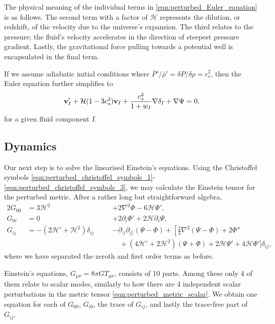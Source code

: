 The physical meaning of the individual terms in \eqref{eqn:perturbed_Euler_equation} is as follows. The second term with a factor of $\mathcal{H}$ represents the dilution, or redshift, of the velocity due to the universe's expansion. The third relates to the pressure; the fluid's velocity accelerates in the direction of steepest pressure gradient. Lastly, the gravitational force pulling towards a potential well is encapsulated in the final term.

If we assume adiabatic initial conditions where $\bar{P}'/\bar{\rho}' = \delta P / \delta \rho = c^2_s$, then the Euler equation further simplifies to
\begin{align}
	\mathbf{v}'_I + \mathcal{H} (1 - 3c^2_s) \mathbf{v}_I + \frac{c^2_s}{1+w_I} \nabla\delta_I + \nabla\Psi = 0,
\end{align}
for a given fluid component $I$.


\subsection{Dynamics}

Our next step is to solve the linearised Einstein's equations. Using the Christoffel symbols \eqref{eqn:perturbed_christoffel_symbols_1}-\eqref{eqn:perturbed_christoffel_symbols_3}, we may calculate the Einstein tensor for the perturbed metric. After a rather long but straightforward algebra,
\begin{alignat}{2}
	G_{00} &= 3\mathcal{H}^2 \quad&&+ 2\nabla^2 \Phi - 6 \mathcal{H} \Phi', \label{eqn:perturbed_einstein_tensor_1}\\
	G_{0i} &= 0 \quad&&+ 2\partial_i \Phi' + 2 \mathcal{H} \partial_i \Psi, \label{eqn:perturbed_einstein_tensor_2}\\
	G_{ij} &= -(2\mathcal{H}' + \mathcal{H}^2) \delta_{ij} \quad&&- \partial_{\langle i} \partial_{j \rangle} (\Psi - \Phi) + \left[ \frac{2}{3}\nabla^2 (\Psi-\Phi) + 2\Phi'' \right. \nonumber\\
	& &&\quad + (4\mathcal{H}' + 2\mathcal{H}^2)(\Psi+\Phi) + 2\mathcal{H}\Psi' + 4\mathcal{H}\Phi' \biggr] \delta_{ij}, \label{eqn:perturbed_einstein_tensor_3}
\end{alignat}
where we have separated the zeroth and first order terms as before.

Einstein's equations, $G_{\mu\nu} = 8\pi G T_{\mu\nu}$, consists of 10 parts. Among these only 4 of them relate to scalar modes, similarly to how there are 4 independent scalar perturbations in the metric tensor \eqref{eqn:perturbed_metric_scalar}. We obtain one equation for each of $G_{00}$, $G_{i0}$, the trace of $G_{ij}$, and lastly the trace-free part of $G_{ij}$.

